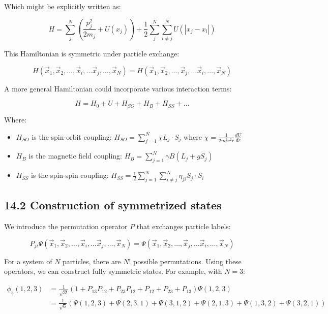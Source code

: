 \documentclass[10pt]{article}
\begin{document}
Which might be explicitly written as:

\begin{equation*}
H=\sum_{j}^{N}(\frac{p_j^2}{2m_j}+U(x_j))+\frac{1}{2}\sum_{j}^{N}\sum_{l\neq j}^{N}U(|x_j-x_l|) \tag{14.2}
\end{equation*}

This Hamiltonian is symmetric under particle exchange:

\begin{equation*}
H(\vec{x}_1,\vec{x}_2,\ldots,\vec{x}_i,\ldots\vec{x}_j,\ldots,\vec{x}_N)=H(\vec{x}_1,\vec{x}_2,\ldots,\vec{x}_j,\ldots\vec{x}_i,\ldots,\vec{x}_N) \tag{14.3}
\end{equation*}


A more general Hamiltonian could incorporate various interaction terms:

\begin{equation*}
H=H_0+U+H_{SO}+H_B+H_{SS}+\ldots \tag{14.4}
\end{equation*}

Where:
\begin{itemize}
  \item $H_{SO}$ is the spin-orbit coupling: $H_{SO}=\sum_{j=1}^{N}\chi L_j\cdot S_j$ where $\chi=\frac{1}{2m_e^2c^2r}\frac{dU}{dr}$
  \item $H_B$ is the magnetic field coupling: $H_B=\sum_{j=1}^{N}\gamma B(L_j+gS_j)$
  \item $H_{SS}$ is the spin-spin coupling: $H_{SS}=\frac{1}{2}\sum_{j=1}^{N}\sum_{i\neq j}^{N}\eta_{ji}S_j\cdot S_i$
\end{itemize}

\subsection*{14.2 Construction of symmetrized states}
We introduce the permutation operator $P$ that exchanges particle labels:

\begin{equation*}
P_{ji}\Psi(\vec{x}_1,\vec{x}_2,\ldots,\vec{x}_i,\ldots\vec{x}_j,\ldots,\vec{x}_N)=\Psi(\vec{x}_1,\vec{x}_2,\ldots,\vec{x}_j,\ldots\vec{x}_i,\ldots,\vec{x}_N) \tag{14.5}
\end{equation*}

For a system of $N$ particles, there are $N!$ possible permutations. Using these operators, we can construct fully symmetric states. For example, with $N=3$:

\begin{align*}
\phi_s(1,2,3)&=\frac{1}{\sqrt{3!}}(1+P_{13}P_{12}+P_{23}P_{12}+P_{12}+P_{23}+P_{13})\Psi(1,2,3)\\
&=\frac{1}{\sqrt{6}}(\Psi(1,2,3)+\Psi(2,3,1)+\Psi(3,1,2)+\Psi(2,1,3)+\Psi(1,3,2)+\Psi(3,2,1)) \tag{14.6}
\end{align*}
\end{document}
